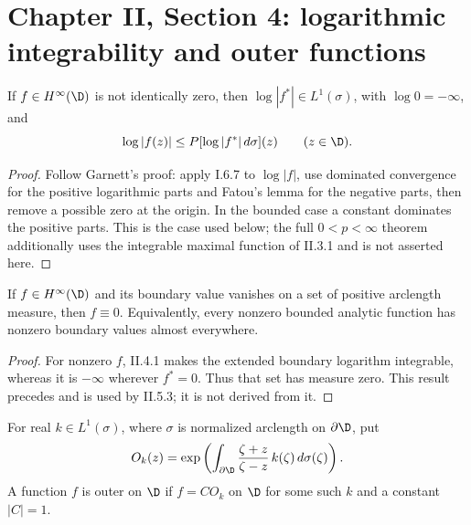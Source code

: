 \section{Chapter II, Section 4: logarithmic integrability and outer functions}

\begin{theorem}
  \label{thm:II_4_1}
  \notready
  \mainline
  If $f\in H^\infty(\D)$ is not identically zero, then
  $\log|f^*|\in L^1(\sigma)$, with $\log0=-\infty$, and
  \[
    \log|f(z)|\le P[\log|f^*|\,d\sigma](z)\qquad(z\in\D).
  \]
  \begin{proof}
    \notready
    Follow Garnett's proof: apply I.6.7 to $\log|f|$, use dominated
    convergence for the positive logarithmic parts and Fatou's lemma for
    the negative parts, then remove a possible zero at the origin.
    In the bounded case a constant dominates the positive parts.
    This is the case used below; the full $0<p<\infty$ theorem additionally
    uses the integrable maximal function of II.3.1 and is not asserted here.
  \end{proof}
\end{theorem}

\begin{corollary}
  \label{cor:II_4_2}
  \notready
  \mainline
  If $f\in H^\infty(\D)$ and its boundary value vanishes on a set of
  positive arclength measure, then $f\equiv0$. Equivalently, every nonzero
  bounded analytic function has nonzero boundary values almost everywhere.
  \begin{proof}
    \notready
    For nonzero $f$, II.4.1 makes the extended boundary logarithm integrable,
    whereas it is $-\infty$ wherever $f^*=0$. Thus that set has measure zero.
    This result precedes and is used by II.5.3; it is not derived from it.
  \end{proof}
\end{corollary}

\begin{definition}
  \label{def:outer_factor}
  \leanok
  For real $k\in L^1(\sigma)$, where $\sigma$ is normalized arclength on
  $\partial\D$, put
  \[
    O_k(z)=\exp\left(\int_{\partial\D}
      \frac{\zeta+z}{\zeta-z}\,k(\zeta)\,d\sigma(\zeta)\right).
  \]
  A function $f$ is outer on $\D$ if $f=C O_k$ on $\D$ for some such $k$
  and a constant $|C|=1$.
\end{definition}

